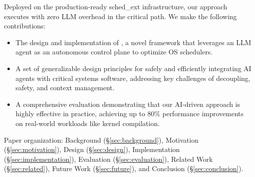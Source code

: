 Deployed on the production-ready sched\_ext infrastructure, our approach executes with zero LLM overhead in the critical path. We make the following contributions:
\begin{itemize}
    \item The design and implementation of \sys, a novel framework that leverages an LLM agent as an autonomous control plane to optimize OS schedulers.
    \item A set of generalizable design principles for safely and efficiently integrating AI agents with critical systems software, addressing key challenges of decoupling, safety, and context management.
    \item A comprehensive evaluation demonstrating that our AI-driven approach is highly effective in practice, achieving up to 80\% performance improvements on real-world workloads like kernel compilation.
\end{itemize}

Paper organization: Background (§\ref{sec:background}), Motivation (§\ref{sec:motivation}), Design (§\ref{sec:design}), Implementation (§\ref{sec:implementation}), Evaluation (§\ref{sec:evaluation}), Related Work (§\ref{sec:related}), Future Work (§\ref{sec:future}), and Conclusion (§\ref{sec:conclusion}).